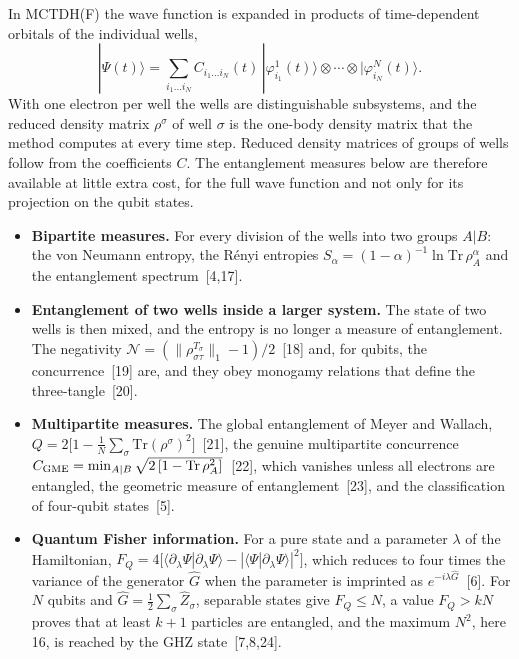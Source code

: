 \documentclass[12pt,a4paper]{article}
\begin{document}
In MCTDH(F) the wave function is expanded in products of
time-dependent orbitals of the individual wells,
\[
  |\Psi(t)\rangle=\sum_{i_1\dots i_N}C_{i_1\dots i_N}(t)\,
  |\varphi^{1}_{i_1}(t)\rangle\otimes\cdots\otimes|\varphi^{N}_{i_N}(t)\rangle .
\]
With one electron per well the wells are distinguishable subsystems,
and the reduced density matrix $\rho^\sigma$ of well $\sigma$ is the
one-body density matrix that the method computes at every time step.
Reduced density matrices of groups of wells follow from the
coefficients $C$.  The entanglement measures below are therefore
available at little extra cost, for the full wave function and not
only for its projection on the qubit states.
\begin{itemize}
  \item \textbf{Bipartite measures.}  For every division of the wells
  into two groups $A|B$: the von Neumann entropy, the R\'enyi
  entropies $S_\alpha=(1-\alpha)^{-1}\ln\mathrm{Tr}\,\rho_A^\alpha$
  and the entanglement spectrum~[4,17].
  \item \textbf{Entanglement of two wells inside a larger system.}
  The state of two wells is then mixed, and the entropy is no longer
  a measure of entanglement.  The negativity
  $\mathcal N=(\|\rho_{\sigma\tau}^{T_\sigma}\|_1-1)/2$~[18] and, for
  qubits, the concurrence~[19] are, and they obey monogamy
  relations that define the three-tangle~[20].
  \item \textbf{Multipartite measures.}  The global entanglement of
  Meyer and Wallach,
  $Q=2\bigl[1-\tfrac1N\sum_\sigma\mathrm{Tr}(\rho^\sigma)^2\bigr]$~[21],
  the genuine multipartite concurrence
  $C_{\rm GME}=\min_{A|B}\sqrt{2\,[1-\mathrm{Tr}\,\rho_A^2]}$~[22],
  which vanishes unless all electrons are entangled, the geometric
  measure of entanglement~[23], and the classification of four-qubit
  states~[5].
  \item \textbf{Quantum Fisher information.}  For a pure state and a
  parameter $\lambda$ of the Hamiltonian,
  $F_Q=4\bigl[\langle\partial_\lambda\Psi|\partial_\lambda\Psi\rangle
  -|\langle\Psi|\partial_\lambda\Psi\rangle|^2\bigr]$, which reduces
  to four times the variance of the generator $\hat G$ when the
  parameter is imprinted as $e^{-i\lambda\hat G}$~[6].  For $N$ qubits
  and $\hat G=\tfrac12\sum_\sigma\hat Z_\sigma$, separable states give
  $F_Q\le N$, a value $F_Q>kN$ proves that at least $k+1$ particles
  are entangled, and the maximum $N^2$, here 16, is reached by the GHZ
  state~[7,8,24].
\end{itemize}
\end{document}

